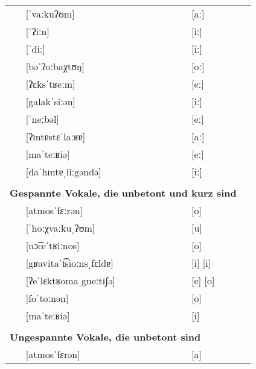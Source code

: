 \begin{longtable}[l]{p{0.1mm}lll}
  & [ˈvaːkuʔʊm]              & [aː]                                          \\
  & [ˈʔiːn]                  & [iː]                                          \\
  & [ˈdiː]                   & [iː]                                          \\
  & [bəˈʔoːbaχtʊŋ]           & [oː]                                          \\
  & [ʔɛksˈtʁeːm]             & [eː]                                          \\
  & [galakˈsiːən]            & [iː]                                          \\
  & [ˈneːbəl]                & [eː]                                          \\
  & [ʔɪntɐstɛˈlaːʁɐ]         & [aː]                                          \\
  & [maˈteːʁiə]              & [eː]                                          \\
  & [daˈhɪntɐˌliːgəndə]      & [iː]                                          \\
  \multicolumn{3}{l}{ }                                                      \\
  \multicolumn{3}{l}{\textbf{Gespannte Vokale, die unbetont und kurz sind}}  \\
  & [atmosˈfɛːrən]            & [o]                                          \\
  & [ˈhoːχvaːkuˌʔʊm]         & [u]                                           \\
  & [nɔ͡œˈtʁiːnos]            & [o]                                           \\
  & [gʁavitaˈt͡sioːnsˌfɛldɐ]  & [i] [i]                                       \\
  & [ʔeˈlɛktʁomaˌgneːtɪʃə]   & [e] [o]                                       \\
  & [foˈtoːnən]              & [o]                                           \\
  & [maˈteːʁiə]              & [i]                                           \\
  \multicolumn{3}{l}{ }                                                      \\
  \multicolumn{3}{l}{\textbf{Ungespannte Vokale, die unbetont sind}}         \\
  & [atmosˈfɛrən]            & [a]                                           \\

\end{longtable}
